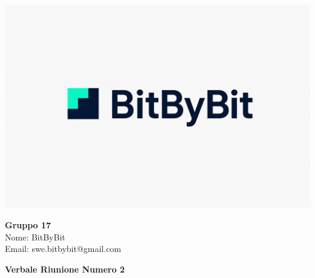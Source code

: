\documentclass[a4paper,12pt]{article}
\begin{document}
\begin{center}
    \begin{minipage}{0.25\textwidth}
        \centering
        \includegraphics[width=\linewidth]{logo.png}
    \end{minipage}
    \hfill
    \begin{minipage}{0.7\textwidth}
        \raggedright
        {\LARGE \textbf{Gruppo 17}}\\[0.3cm]
        {\large
        Nome: BitByBit\\
        Email: swe.bitbybit@gmail.com
        }
    \end{minipage}
\end{center}

\vspace{1.5cm}

\begin{center}
    {\LARGE \textbf{Verbale Riunione Numero 2}}
\end{center}

\vspace*{\fill} %
\end{document}
